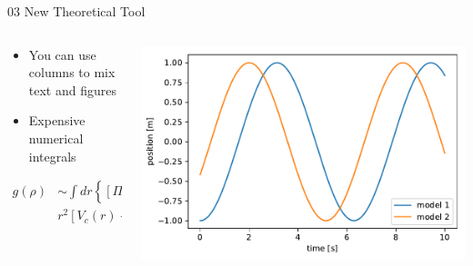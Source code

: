 \documentclass{beamer}
\begin{document}
\begin{frame}{}
\begin{columns}[t]
\begin{column}{0.32\linewidth}
				\begin{block}{03 New Theoretical Tool}
					\begin{columns}
						\begin{column}{.45\linewidth}
							\begin{itemize}
								\item You can use columns to mix text and figures
								\item Expensive numerical integrals
							\end{itemize}
							\begin{equation*}
								\begin{aligned}
									g(\rho) &\sim \int dr \left\{ \left[\Pi_0(\rho,r) \right]^2 + \ldots \right\} \\
									& r^2 \left[ V_c(r) + 3W_c(r) + \ldots \right]
								\end{aligned}
							\end{equation*}
						\end{column}
						\begin{column}{.45\linewidth}
							\begin{center}
								\includegraphics[width=\textwidth]{fig_example.pdf}
							\end{center}
						\end{column}
					\end{columns}


\end{block}
\end{column}
\end{columns}
\end{frame}
\end{document}

